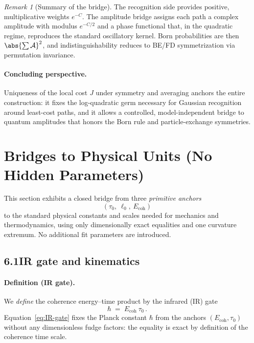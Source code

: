 \documentclass[12pt,a4paper]{article}
\theoremstyle{definition}
\theoremstyle{remark}
\newtheorem{remark}[theorem]{Remark}
\begin{document}
\begin{remark}[Summary of the bridge]
The recognition side provides positive, multiplicative weights $e^{-C}$. The amplitude bridge assigns each path a complex amplitude with modulus $e^{-C/2}$ and a phase functional that, in the quadratic regime, reproduces the standard oscillatory kernel. Born probabilities are then \(\abs{\sum \mathcal{A}}^2\), and indistinguishability reduces to BE/FD symmetrization via permutation invariance.
\end{remark}

\paragraph{Concluding perspective.} Uniqueness of the local cost $J$ under symmetry and averaging anchors the entire construction: it fixes the log-quadratic germ necessary for Gaussian recognition around least-cost paths, and it allows a controlled, model-independent bridge to quantum amplitudes that honors the Born rule and particle-exchange symmetries.











\section{Bridges to Physical Units (No Hidden Parameters)}

\noindent
This section exhibits a closed bridge from three \emph{primitive anchors}
\[
(\tau_0,\ \ell_0,\ E_{\mathrm{coh}})
\]
to the standard physical constants and scales needed for mechanics and thermodynamics, using only
dimensionally exact equalities and one curvature extremum. No additional fit parameters are introduced.

\bigskip


\subsection*{6.1\quad IR gate and kinematics}
\paragraph{Definition (IR gate).}
We \emph{define} the coherence energy--time product by the infrared (IR) gate
\begin{equation}
\label{eq:IR-gate}
\hbar \;=\; E_{\mathrm{coh}}\ \tau_0\,.
\end{equation}
Equation~\eqref{eq:IR-gate} fixes the Planck constant \(\hbar\) from the anchors \((E_{\mathrm{coh}},\tau_0)\) without any dimensionless fudge factors: the equality is exact by definition of the coherence time scale.
\end{document}

